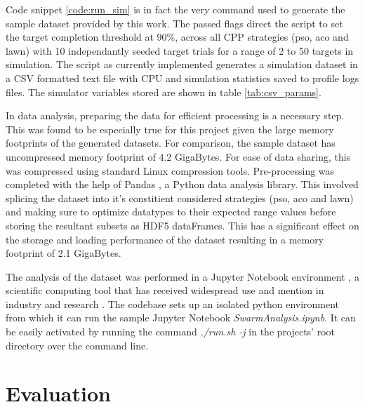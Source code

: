 \documentclass{report}
\begin{document}
Code snippet \ref{code:run_sim} is in fact the very command used to generate the sample dataset provided by this work. The passed flags direct the script to set the target completion threshold at $90\%$, across all CPP strategies (pso, aco and lawn) with 10 independantly seeded target trials for a range of 2 to 50 targets in simulation. The script as currently implemented generates a simulation dataset in a CSV formatted text file with CPU and simulation statistics saved to profile logs files. The simulator variables stored are shown in table \ref{tab:csv_params}.

In data analysis, preparing the data for efficient processing is a necessary step. This was found to be especially true for this project given the large memory footprints of the generated datasets. For comparison, the sample dataset has uncompressed memory footprint of 4.2 GigaBytes. For ease of data sharing, this was compressed using standard Linux compression tools. Pre-processing was completed with the help of Pandas \cite{Pandas}, a Python data analysis library. This involved splicing the dataset into it's constitient considered strategies (pso, aco and lawn) and making sure to optimize datatypes to their expected range values before storing the resultant subsets as HDF5 dataFrames. This has a significant effect on the storage and loading performance of the dataset resulting in a memory footprint of 2.1 GigaBytes.

The analysis of the dataset was performed in a Jupyter Notebook environment \cite{Jupyter}, a scientific computing tool that has received widespread use and mention in industry and research \cite{Helen2014} \cite{ACM2017}. The codebase sets up an isolated python environment from which it can run the sample Jupyter Notebook \textit{SwarmAnalysis.ipynb}. It can be easily activated by running the command \textit{./run.sh -j} in the projects' root directory over the command line.

\chapter{Evaluation} \label{evaluation}
\end{document}
